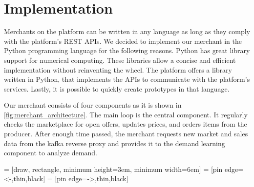 %

\section{Implementation}
Merchants on the \pricewars platform can be written in any language as long as they comply with the platform's REST APIs.
We decided to implement our merchant in the Python programming language for the following reasons.
Python has great library support for numerical computing.
These libraries allow a concise and efficient implementation without reinventing the wheel.
The \pricewars platform offers a library written in Python, that implements the APIs to communicate with the platform's services.
Lastly, it is possible to quickly create prototypes in that language.

Our merchant consists of four components as it is shown in \cref{fig:merchant_architecture}.
The main loop is the central component.
It regularly checks the marketplace for open offers, updates prices, and orders items from the producer.
After enough time passed, the merchant requests new market and sales data from the kafka reverse proxy and provides it to the demand learning component to analyze demand.

\bgroup
{} = [draw, rectangle, minimum height=3em, minimum width=6em]
 = [pin edge={<-,thin,black}]
 = [pin edge={->,thin,black}]


\renewcommand{\arraystretch}{0.4}

